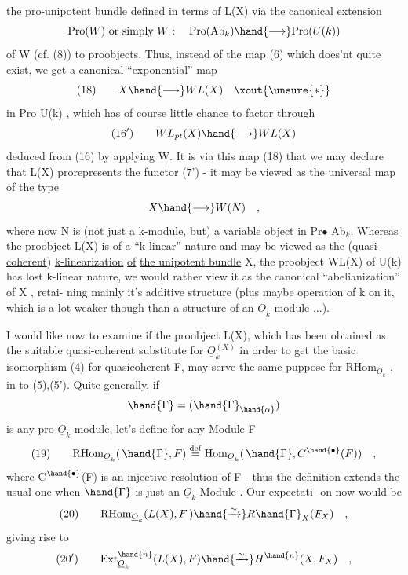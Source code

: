 
the pro-unipotent bundle defined in terms of L(X) via the canonical
extension
\[ \mathrm{Pro}(W) \text{ or simply } W : \quad \mathrm{Pro}(\mathrm{Ab}_k) \hand{\longrightarrow} \mathrm{Pro}(U(k)) \]
of W  (cf. (8)) to proobjects. Thus, instead of the map (6) which
does'nt quite exist, we get a canonical ``exponential'' map
\[ (18) \qquad X \hand{\longrightarrow} WL(X) \quad \xout{\unsure{*}} \]
in Pro U(k) , which has of course little chance to factor through
\[ (16') \qquad WL_{pt}(X) \hand{\longrightarrow} WL(X) \]
deduced from (16) by applying W. It is via this map (18) that we may
declare that L(X) prorepresents the functor (7') - it may be viewed
as the universal map of the type
\[ X \hand{\longrightarrow} W(N) \quad , \]
where now N is (not just a k-module, but) a variable object in Pr$\bullet$ Ab$_k$.
Whereas the proobject L(X) is of a ``k-linear'' nature and may be viewed
as the (\uline{quasi-coherent}) \uline{k-linearization} \uline{of} \uline{the unipotent bundle} X,
the proobject WL(X)  of U(k) has lost  k-linear nature,
we would rather view it as the canonical ``abelianization'' of X , retai-%
ning mainly it's additive structure (plus maybe operation of k on it,
which is a lot weaker though than a structure of an $\underline{O}_k$-module ...).

I would like now to examine if the  proobject L(X), which has
been obtained as the suitable quasi-coherent substitute for $\underline{O}_k^{(X)}$
in order to get the basic isomorphism (4) for quasicoherent F, may
serve the same puppose for RHom$_{\underline{O}_k}$ , in  to (5),(5'). Quite
generally, if
\[ \hand{\Gamma}=(\hand{\Gamma}_{\hand{\alpha}}) \]
is any pro-$\underline{O}_k$-module, let's define for any Module F
\[ (19) \qquad \mathrm{RHom}_{\underline{O}_k}(\,\hand{\Gamma}, F) \overset{\mathrm{def}}{=} \mathrm{Hom}_{\underline{O}_k}(\,\hand{\Gamma} , C^{\hand{\bullet}}(F)) \quad , \]
where C$^{\hand{\bullet}}$(F) is an injective resolution of F - thus the definition
extends the usual one  when $\hand{\Gamma}$ is just an $\underline{O}_k$-Module . Our expectati-%
on now would be
\[ (20) \qquad \mathrm{RHom}_{\underline{O}_k}(L(X), F\,) \hand{\xrightarrow{\sim}} R\hand{\Gamma}_X(F_X) \quad , \]
giving rise to
\[ (20') \qquad \mathrm{Ext}^{\hand{n}}_{\underline{O}_k}(L(X),F) \hand{\xrightarrow{\sim}} H^{\hand{n}}(X,F_X) \quad , \]


